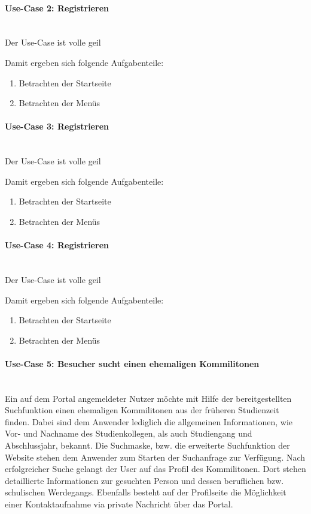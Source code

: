 \paragraph{Use-Case 2: Registrieren}\quad\\
Der Use-Case ist volle geil

Damit ergeben sich folgende Aufgabenteile:
\begin{enumerate}

		\item Betrachten der Startseite
		\item Betrachten der Menüs
\end{enumerate}

\paragraph{Use-Case 3: Registrieren}\quad\\
Der Use-Case ist volle geil

Damit ergeben sich folgende Aufgabenteile:
\begin{enumerate}

		\item Betrachten der Startseite
		\item Betrachten der Menüs
\end{enumerate}


\paragraph{Use-Case 4: Registrieren}\quad\\
Der Use-Case ist volle geil

Damit ergeben sich folgende Aufgabenteile:
\begin{enumerate}

		\item Betrachten der Startseite
		\item Betrachten der Menüs
\end{enumerate}


\paragraph{Use-Case 5: Besucher sucht einen ehemaligen Kommilitonen}\quad \\
Ein auf dem Portal angemeldeter Nutzer möchte mit Hilfe der bereitgestellten Suchfunktion einen ehemaligen Kommilitonen aus der früheren Studienzeit finden. Dabei sind dem Anwender lediglich die allgemeinen Informationen, wie Vor- und Nachname des Studienkollegen, als auch Studiengang und Abschlussjahr, bekannt. Die Suchmaske, bzw. die erweiterte Suchfunktion der Website stehen dem Anwender zum Starten der Suchanfrage zur Verfügung. Nach erfolgreicher Suche gelangt der User auf das Profil des Kommilitonen. Dort stehen detaillierte Informationen zur gesuchten Person und dessen beruflichen bzw. schulischen Werdegangs. Ebenfalls besteht auf der Profilseite die Möglichkeit einer Kontaktaufnahme via private Nachricht über das Portal.

